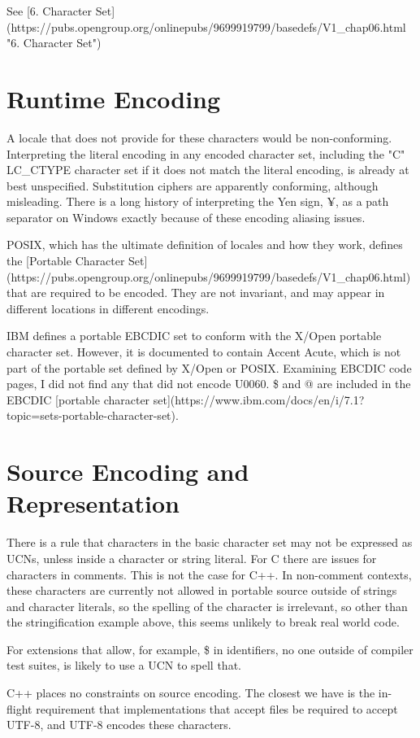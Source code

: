 \documentclass[a4paper,10pt,oneside,openany,final,article]{memoir}
\begin{document}
See [6. Character Set](https://pubs.opengroup.org/onlinepubs/9699919799/basedefs/V1_chap06.html "6. Character Set")

\section{Runtime Encoding}
A locale that does not provide for these characters would be non-conforming. Interpreting the literal encoding in any encoded character set, including the "C" LC_CTYPE character set if it does not match the literal encoding, is already at best unspecified. Substitution ciphers are apparently conforming, although misleading. There is a long history of interpreting the Yen sign, ¥, as a path separator on Windows exactly because of these encoding aliasing issues.

POSIX, which has the ultimate definition of locales and how they work, defines the [Portable Character Set](https://pubs.opengroup.org/onlinepubs/9699919799/basedefs/V1_chap06.html) that are required to be encoded. They are not invariant, and may appear in different locations in different encodings.

IBM defines a portable EBCDIC set to conform with the X/Open portable character set. However, it is documented to contain Accent Acute, which is not part of the portable set defined by X/Open or POSIX. Examining EBCDIC code pages, I did not find any that did not encode U0060. \$ and @ are included in the EBCDIC [portable character set](https://www.ibm.com/docs/en/i/7.1?topic=sets-portable-character-set).

\section{Source Encoding and Representation}
There is a rule that characters in the basic character set may not be expressed as UCNs, unless inside a character or string literal. For C there are issues for characters in comments. This is not the case for C++. In non-comment contexts, these characters are currently not allowed in portable source outside of strings and character literals, so the spelling of the character is irrelevant, so other than the stringification example above, this seems unlikely to break real world code.

For extensions that allow, for example, \$ in identifiers, no one outside of compiler test suites, is likely to use a UCN to spell that.

C++ places no constraints on source encoding. The closest we have is the in-flight requirement that implementations that accept files be required to accept UTF-8, and UTF-8 encodes these characters.
\end{document}
